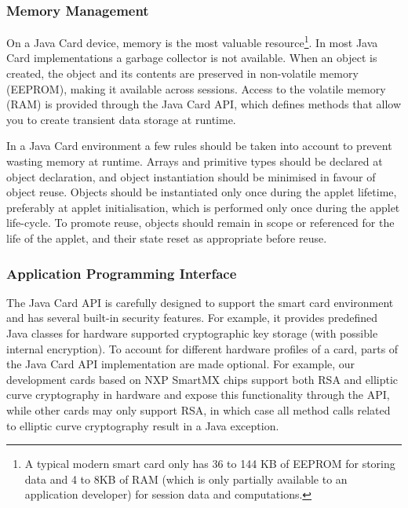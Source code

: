 \subsubsection{Memory Management}

On a Java Card device, memory is the most valuable resource\footnote{A typical 
modern smart card only has 36 to 144 KB of EEPROM for storing data and 4 to 8KB
of RAM (which is only partially available to an application developer) for
session data and computations.}. In most Java Card implementations a garbage
collector is not available. When an object is created, the object and its
contents are preserved in non-volatile 
memory (EEPROM), making it available 
across sessions. Access to the volatile memory 
(RAM) is provided through the Java Card API, which defines methods 
that allow you to create transient data storage at runtime.

In a Java Card environment a few rules should be taken into account to prevent
wasting memory at runtime. Arrays and primitive types should be declared at
object declaration, and object instantiation should be minimised in favour of
object reuse. Objects should be instantiated only once during the applet
lifetime, preferably at applet initialisation, which is performed only once
during the applet life-cycle. To promote reuse, objects should remain in scope
or referenced for the life of the applet, and their state reset as appropriate
before reuse.

\subsubsection{Application Programming Interface}

The Java Card API is carefully designed to support the
smart card environment and has several built-in security features. For example,
it provides predefined Java classes for hardware supported cryptographic key
storage (with possible internal encryption). To account for different hardware
profiles of a card, parts of the Java Card API implementation are made optional.
For example, our development cards based on NXP SmartMX chips support both RSA
 and elliptic curve cryptography in hardware and expose this functionality through the API, while
other cards may only support RSA, in which case all method calls related to
elliptic curve cryptography result in a Java exception.

